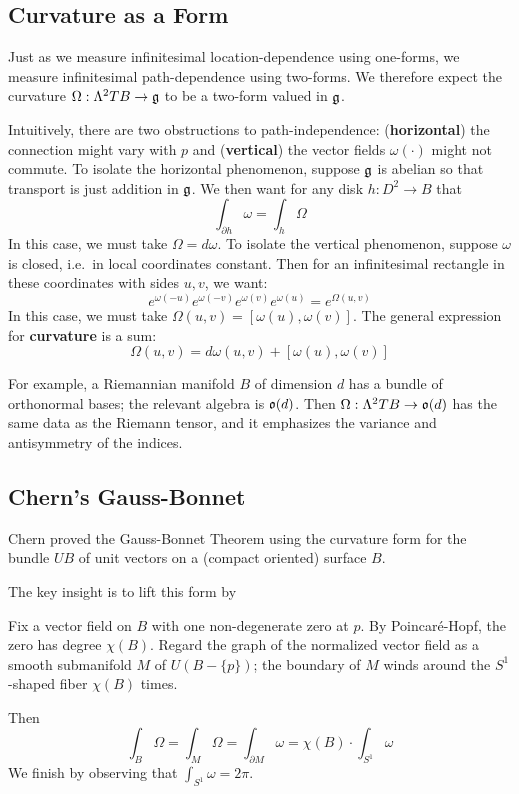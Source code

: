 \documentclass[twocolumn, 11pt]{article}
\newcommand{\gG}{\frak{g}}
\newcommand{\oO}{\frak{o}}
\theoremstyle{definition}
\newcommand{\msec}[1]{\subsection*{\color{mblu}\textsf{#1}}}
\begin{document}
\newpage
    \msec{Curvature as a Form}
        Just as we measure infinitesimal location-dependence using one-forms,
        we measure infinitesimal path-dependence using two-forms.  We therefore
        expect the curvature $\Omega : \Lambda^2 TB \to \gG$ to be a two-form 
        valued in $\gG$.

        Intuitively, there are two obstructions to path-independence:
        (\textbf{horizontal}) the connection might vary with $p$ and  
        (\textbf{vertical}) the vector fields $\omega(\cdot)$ might not
        commute.
        To isolate the horizontal phenomenon, suppose $\gG$ is
        abelian so that transport is just addition in $\gG$.  We then
        want for any disk $h: D^2 \to B$ that
        $$
            \int_{\partial h} \omega = \int_h \Omega
        $$
        In this case, we must take $\Omega = d\omega$.
        To isolate the vertical phenomenon, suppose $\omega$ is closed, i.e.\
        in local coordinates constant.  Then for an
        infinitesimal rectangle in these coordinates with sides $u, v$, we
        want:
        $$
            e^{\omega(-u)}e^{\omega(-v)}e^{\omega(v)}e^{\omega(u)}
            =
            e^{\Omega(u,v)}
        $$
        In this case, we must take $\Omega(u,v) = [\omega(u), \omega(v)]$.
        The general expression for \textbf{curvature} is a sum:
        $$
            \Omega(u,v) = d\omega(u,v) + [\omega(u), \omega(v)]
        $$

        For example, a Riemannian manifold $B$ of dimension $d$ has a bundle of
        orthonormal bases; the relevant algebra is $\oO(d)$.  Then
        $\Omega:\Lambda^2 TB \to \oO(d)$ has the same data as the Riemann
        tensor, and it emphasizes the variance and antisymmetry of the indices. 

    \newpage
    \msec{Chern's Gauss-Bonnet}
        Chern proved the Gauss-Bonnet Theorem using the curvature form for the
        bundle $UB$ of unit vectors on a (compact oriented) surface $B$. 

        The key insight is to lift this form by   

        Fix a vector field on $B$ with one non-degenerate zero at $p$.
        By Poincar\'e-Hopf, the zero has degree $\chi(B)$. 
        Regard the graph of the normalized vector field as a smooth
        submanifold $M$ of $U(B - \{p\})$; the boundary of $M$ winds around
        the $S^1$-shaped fiber $\chi(B)$ times.

        Then
        $$
            \int_B \Omega = \int_M \Omega
                          = \int_{\partial M} \omega
                          = \chi(B) \cdot \int_{S^1} \omega
        $$
        We finish by observing that $\int_{S^1} \omega = 2\pi$.
\end{document}
